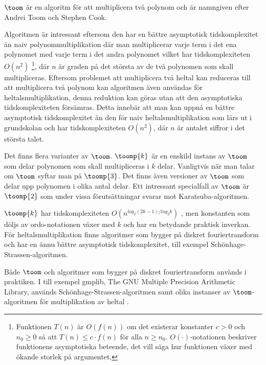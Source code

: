 $\toom$ är en algoritm för att multiplicera två polynom och är namngiven efter
Andrei Toom och Stephen Cook.

Algoritmen är intressant eftersom den har en bättre asymptotisk tidskomplexitet
än naiv polynommultiplikation där man multiplicerar varje term i det ena
polynomet med varje term i det andra polynomet vilket har tidskomplexiteten
$O\left(n^2\right)$ \footnote{Funktionen $T(n)$ är $O(f(n))$ om det existerar
konstanter $c > 0$ och $n_0 \geq 0$ så att $T(n) \leq c \cdot f(n)$ för alla $n
\geq n_0$. $O(\cdot )$-notationen beskriver funktionens asymptotiska beteende,
det vill säga hur funktionen växer med ökande storlek på argumentet.}, där $n$
är graden på det största av de två polynomen som skall multipliceras. Eftersom
problemet att multiplicera två heltal kan reduceras till att multiplicera två
polynom kan algoritmen även användas för heltalsmultiplikation, denna reduktion
kan göras utan att den asymptotiska tidskomplexiteten försämras. Detta innebär
att man kan uppnå en bättre asymptotisk tidskomplexitet än den för naiv
heltalsmultiplikation som lärs ut i grundskolan och har tidskomplexiteten
$O\left(n^2\right)$, där $n$ är antalet siffror i det största talet.

Det finns flera varianter av $\toom$. $\toomp{k}$ är en enskild instans av
$\toom$ som delar polynomen som skall multipliceras i $k$ delar. Vanligtvis när
man talar om $\toom$ syftar man på $\toomp{3}$. Det finns även versioner av
$\toom$ som delar upp polynomen i olika antal delar. Ett intressant specialfall
av $\toom$ är $\toomp{2}$ som under vissa förutsättningar svarar mot
Karatsuba-algoritmen.

$\toomp{k}$ har tidskomplexiteten $O(n^{log_2(2 k-1)/log_2 k})$
\cite{bodrato2007towards}, men konstanten som döljs av ordo-notationen växer
med $k$ och har en betydande praktisk inverkan. För heltalsmultiplikation
finns algoritmer som bygger på diskret fouriertransform och har en ännu bättre
asymptotisk tidskomplexitet, till exempel Schönhage-Strassen-algoritmen.

Både $\toom$ och algoritmer som bygger på diskret fouriertransform används i
praktiken. I till exempel gmplib, The GNU Multiple Precision Arithmetic
Library, används Schönhage-Strassen-algoritmen samt olika instanser av
$\toom$-algoritmen för multiplikation av heltal \cite{gmpdoc}.
